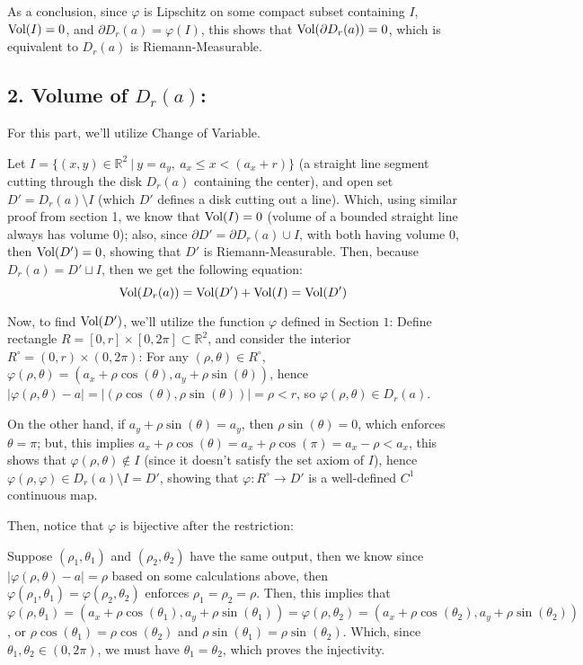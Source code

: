 \documentclass{article}
\begin{document}
As a conclusion, since $\varphi$ is Lipschitz on some compact subset containing $I$, $\textmd{Vol}(I)=0$, and $\partial D_r(a)=\varphi(I)$, this shows that $\textmd{Vol}(\partial D_r(a)) = 0$, which is equivalent to $D_r(a)$ is Riemann-Measurable.

\subsection*{2. Volume of $D_r(a)$:}
For this part, we'll utilize Change of Variable. 

Let $I=\{(x,y)\in\mathbb{R}^2\ |\ y=a_y,\ a_x\leq x < (a_x+r)\}$ (a straight line segment cutting through the disk $D_r(a)$ containing the center), and open set $D' = D_r(a)\setminus I$ (which $D'$ defines a disk cutting out a line). Which, using similar proof from section 1, we know that $\textmd{Vol}(I) = 0$ (volume of a bounded straight line always has volume $0$); also, since $\partial D' = \partial D_r(a)\cup I$, with both having volume $0$, then $\textmd{Vol}(D') = 0$, showing that $D'$ is Riemann-Measurable.
Then, because $D_r(a)= D' \sqcup I$, then we get the following equation: 
\begin{equation}
    \textmd{Vol}(D_r(a))=\textmd{Vol}(D') + \textmd{Vol}(I) = \textmd{Vol}(D')
\end{equation}

\hfil

Now, to find $\textmd{Vol}(D')$, we'll utilize the function $\varphi$ defined in Section $1$: Define rectangle $R=[0,r]\times [0,2\pi]\subset\mathbb{R}^2$, and consider the interior $R^\circ = (0,r)\times (0,2\pi)$: For any $(\rho,\theta)\in R^\circ$, $\varphi(\rho,\theta)=(a_x+\rho\cos(\theta),a_y+\rho\sin(\theta))$, hence $|\varphi(\rho,\theta)-a| = |(\rho\cos(\theta),\rho\sin(\theta))| = \rho <r$, so $\varphi(\rho,\theta)\in D_r(a)$.

On the other hand, if $a_y+\rho\sin(\theta) = a_y$, then $\rho\sin(\theta) = 0$, which enforces $\theta = \pi$; but, this implies $a_x+\rho\cos(\theta) = a_x+\rho\cos(\pi) = a_x-\rho<a_x$, this shows that $\varphi(\rho,\theta)\notin I$ (since it doesn't satisfy the set axiom of $I$), hence $\varphi(\rho,\varphi)\in D_r(a)\setminus I = D'$, showing that $\varphi:R^\circ\rightarrow D'$ is a well-defined $C^1$ continuous map.

\hfil

Then, notice that $\varphi$ is bijective after the restriction: 

Suppose $(\rho_1,\theta_1)$ and $(\rho_2,\theta_2)$ have the same output, then we know since $|\varphi(\rho,\theta)-a| = \rho$ based on some calculations above, then $\varphi(\rho_1,\theta_1)=\varphi(\rho_2,\theta_2)$ enforces $\rho_1 = \rho_2 = \rho$. Then, this implies that $\varphi(\rho,\theta_1) = (a_x+\rho\cos(\theta_1),a_y+\rho\sin(\theta_1))=\varphi(\rho,\theta_2)=(a_x+\rho\cos(\theta_2),a_y+\rho\sin(\theta_2))$, or $\rho\cos(\theta_1)=\rho\cos(\theta_2)$ and $\rho\sin(\theta_1)=\rho\sin(\theta_2)$. Which, since $\theta_1,\theta_2\in (0,2\pi)$, we must have $\theta_1=\theta_2$, which proves the injectivity.
\end{document}
